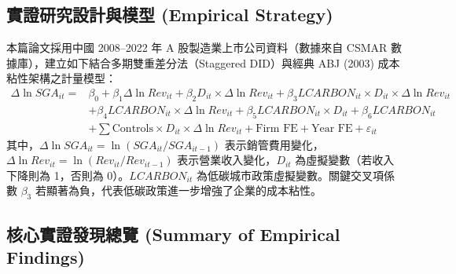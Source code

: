 \documentclass[11pt,a4paper]{article}
\begin{document}
\subsection{實證研究設計與模型 (Empirical Strategy)}
本篇論文採用中國 2008--2022 年 A 股製造業上市公司資料（數據來自 CSMAR 數據庫），建立如下結合多期雙重差分法（Staggered DID）與經典 ABJ (2003) 成本粘性架構之計量模型：
\begin{equation}
\begin{aligned}
\Delta \ln SGA_{it} = & \beta_0 + \beta_1 \Delta \ln Rev_{it} + \beta_2 D_{it} \times \Delta \ln Rev_{it} + \beta_3 LCARBON_{it} \times D_{it} \times \Delta \ln Rev_{it} \\
& + \beta_4 LCARBON_{it} \times \Delta \ln Rev_{it} + \beta_5 LCARBON_{it} \times D_{it} + \beta_6 LCARBON_{it} \\
& + \sum \text{Controls} \times D_{it} \times \Delta \ln Rev_{it} + \text{Firm FE} + \text{Year FE} + \varepsilon_{it}
\end{aligned}
\end{equation}
其中，$\Delta \ln SGA_{it} = \ln(SGA_{it} / SGA_{it-1})$ 表示銷管費用變化，$\Delta \ln Rev_{it} = \ln(Rev_{it} / Rev_{it-1})$ 表示營業收入變化，$D_{it}$ 為虛擬變數（若收入下降則為 1，否則為 0）。$LCARBON_{it}$ 為低碳城市政策虛擬變數。關鍵交叉項係數 $\beta_3$ 若顯著為負，代表低碳政策進一步增強了企業的成本粘性。

\subsection{核心實證發現總覽 (Summary of Empirical Findings)}
\end{document}
